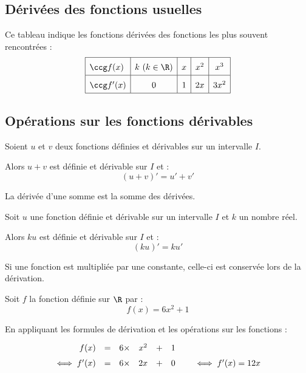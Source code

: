 \subsection{Dérivées des fonctions usuelles}

\begin{prop}
	Ce tableau indique les fonctions dérivées des fonctions les plus souvent rencontrées :
	\[
		\def\arraystretch{1.7}
		\begin{array}{|l|c|c|c|c|} \hline
			\ccg f(x)  & k~(k\in\R) & x & x^2 & x^3  \\ \hline
			\ccg f'(x) & 0          & 1 & 2x  & 3x^2 \\ \hline
		\end{array}
	\]
\end{prop}

\subsection{Opérations sur les fonctions dérivables}

\begin{prop}
	Soient $u$ et $v$ deux fonctions définies et dérivables sur un intervalle $I$.

	Alors $u+v$ est définie et dérivable sur $I$ et :
	\[
		(u+v)' = u' + v'
	\]

	La dérivée d'une somme est la somme des dérivées.
\end{prop}

\begin{prop}
	Soit $u$ une fonction définie et dérivable sur un intervalle $I$ et $k$ un nombre réel.

	Alors $ku$ est définie et dérivable sur $I$ et :
	\[
		(ku)' = k u'
	\]

	Si une fonction est multipliée par une constante, celle-ci est conservée lors de la dérivation.
\end{prop}
\begin{ex}
	Soit $f$ la fonction définie sur $\R$ par :
	\[
		f(x) = 6x^2 + 1
	\]

	En appliquant les formules de dérivation et les opérations sur les fonctions :
	\[
		\def\arraystretch{1.5}
		\begin{array}{rccccl}
			f(x)       & = & 6 \times & x^2 & + & 1                              \\
			\iff f'(x) & = & 6 \times & 2x  & + & 0 \qquad\iff f^\prime(x) = 12x
		\end{array}
	\]
\end{ex}

